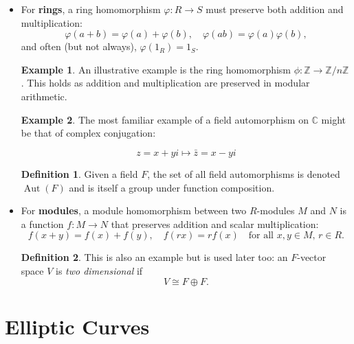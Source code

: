 \documentclass{article}
\theoremstyle{definition}
\newtheorem{definition}{Definition}[section]
\theoremstyle{definition}
\theoremstyle{definition}
\newtheorem{eg}{Example}[section]
\newcommand{\Aut}{\operatorname{Aut}}
\newcommand{\C}{\mathbb{C}}
\begin{document}
\begin{itemize}
  \item For \textbf{rings}, a ring homomorphism \( \varphi : R \to S \) must preserve both addition and multiplication:
  \[
  \varphi(a + b) = \varphi(a) + \varphi(b), \quad \varphi(ab) = \varphi(a)\varphi(b),
  \]
  and often (but not always), \( \varphi(1_R) = 1_S \).

\begin{eg}
  An illustrative example is the ring homomorphism $\phi:\mathbb{Z}\to \mathbb{Z}/n\mathbb{Z}$. This holds as addition and multiplication are preserved in modular arithmetic. 
\end{eg}

\begin{eg}
    The most familiar example of a field automorphism on $\C$ might be that of complex conjugation:

    $$z=x+yi\mapsto \bar{z}=x-yi$$
\end{eg}  
\begin{definition} Given a field $F$,
    the set of all field automorphisms is denoted $\Aut(F)$ and is itself a group under function composition.
\end{definition}
  \item For \textbf{modules}, a module homomorphism between two \( R \)-modules \( M \) and \( N \) is a function \( f : M \to N \) that preserves addition and scalar multiplication:
  \[
  f(x + y) = f(x) + f(y), \quad f(rx) = rf(x) \quad \text{for all } x, y \in M,\, r \in R.
  \]

  \begin{definition} This is also an example but is used later too: an $F$-vector space $V$ is \emph{two dimensional} if
$$V\cong F\oplus F.$$ 
  \end{definition}

      

    
\end{itemize}






\section{Elliptic Curves}
\end{document}
